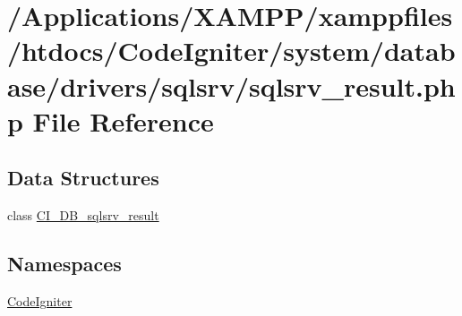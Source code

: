 \hypertarget{sqlsrv__result_8php}{}\section{/\+Applications/\+X\+A\+M\+P\+P/xamppfiles/htdocs/\+Code\+Igniter/system/database/drivers/sqlsrv/sqlsrv\+\_\+result.php File Reference}
\label{sqlsrv__result_8php}
\subsection*{Data Structures}
\begin{DoxyCompactItemize}
\item 
class \mbox{\hyperlink{class_c_i___d_b__sqlsrv__result}{C\+I\+\_\+\+D\+B\+\_\+sqlsrv\+\_\+result}}
\end{DoxyCompactItemize}
\subsection*{Namespaces}
\begin{DoxyCompactItemize}
\item 
 \mbox{\hyperlink{namespace_code_igniter}{Code\+Igniter}}
\end{DoxyCompactItemize}
